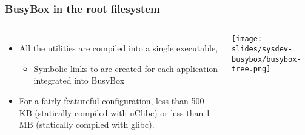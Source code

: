 \begin{frame}
  \frametitle{BusyBox in the root filesystem}
  \begin{columns}[T]
      \begin{itemize}
      \item All the utilities are compiled into a single executable,
        \begin{itemize}
        \item Symbolic links to  are created for each
          application integrated into BusyBox
        \end{itemize}
      \item For a fairly featureful configuration, less than 500 KB
        (statically compiled with uClibc) or less than 1 MB (statically
        compiled with glibc).
      \end{itemize}
      \texttt{[image: slides/sysdev-busybox/busybox-tree.png]}
  \end{columns}
\end{frame}

